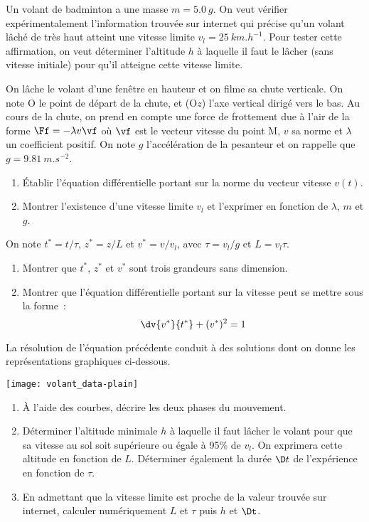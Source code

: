 \documentclass[a4paper, 12pt, final, garamond]{book}
\begin{document}
Un volant de badminton a une masse $m = \SI{5,0}{g}$. On veut vérifier
expérimentalement l'information trouvée sur internet qui précise qu'un volant
lâché de très haut atteint une vitesse limite $v_l = \SI{25}{km.h^{−1}}$. Pour tester
cette affirmation, on veut déterminer l'altitude $h$ à laquelle il faut le lâcher
(sans vitesse initiale) pour qu'il atteigne cette vitesse limite. \bigbreak

On lâche le volant d'une fenêtre en hauteur et on filme sa chute verticale. On
note O le point de départ de la chute, et (O$z$) l'axe vertical dirigé vers le
bas. Au cours de la chute, on prend en compte une force de frottement due à
l'air de la forme $\Ff = -\lambda v\vf$ où $\vf$ est le vecteur vitesse du point
M, $v$ sa norme et $\lambda$ un coefficient positif. On note $g$ l'accélération
de la pesanteur et on rappelle que $g = \SI{9,81}{m.s^{−2}}$.

\begin{enumerate}
    \item Établir l'équation différentielle portant sur la norme du vecteur
        vitesse $v(t)$.
    \item Montrer l'existence d'une vitesse limite $v_l$ et l'exprimer en
        fonction de $\lambda$, $m$ et $g$.
\end{enumerate}
On note $t^* = t/\tau$, $z^* = z/L$ et $v^* = v/v_l$, avec $\tau = v_l/g$ et $L
= v_l\tau$.
\begin{enumerate}[resume]
    \item Montrer que $t^*$, $z^*$ et $v^*$ sont trois grandeurs sans dimension.
    \item Montrer que l'équation différentielle portant sur la vitesse peut se
        mettre sous la forme~:
        \[\dv{v^*}{t^*} + (v^*)^2 = 1\]
\end{enumerate}
La résolution de l'équation précédente conduit à des solutions dont on donne les
représentations graphiques ci-dessous.

\begin{center}
    \texttt{[image: volant\_data-plain]}
\end{center}

\begin{enumerate}[resume]
    \item À l'aide des courbes, décrire les deux phases du mouvement.
    \item Déterminer l'altitude minimale $h$ à laquelle il faut lâcher le volant
        pour que sa vitesse au sol soit supérieure ou égale à 95\% de $v_l$. On
        exprimera cette altitude en fonction de $L$. Déterminer également la
        durée $\D t$ de l'expérience en fonction de $\tau$.
    \item En admettant que la vitesse limite est proche de la valeur trouvée sur
        internet, calculer numériquement $L$ et $\tau$ puis $h$ et $\Dt$.
\end{enumerate}
\end{document}
